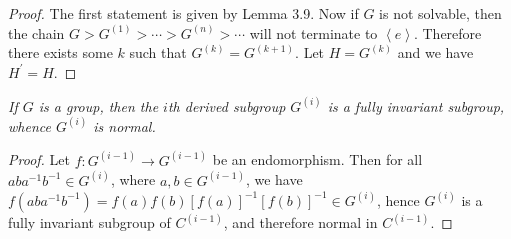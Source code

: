 \begin{proof}
The first statement is given by Lemma 3.9. Now if $G$ is not solvable, then the chain $G>G^{(1)}>\cdots>G^{(n)}>\cdots$ will not terminate to $\left<e\right>$. Therefore there exists some $k$ such that $G^{(k)}=G^{(k+1)}$. Let $H=G^{(k)}$ and we have $H^\prime=H$.
\end{proof}
\begin{problem}\em
If $G$ is a group, then the $i$th derived subgroup $G^{(i)}$ is a fully invariant subgroup, whence $G^{(i)}$ is normal.
\end{problem}
\begin{proof}
Let $f:G^{(i-1)}\to G^{(i-1)}$ be an endomorphism. Then for all $aba^{-1}b^{-1}\in G^{(i)}$, where $a,b\in G^{(i-1)}$, we have $f(aba^{-1}b^{-1})=f(a)f(b)[f(a)]^{-1}[f(b)]^{-1}\in G^{(i)}$, hence $G^{(i)}$ is a fully invariant subgroup of $C^{(i-1)}$, and therefore normal in $C^{(i-1)}$.
\end{proof}
